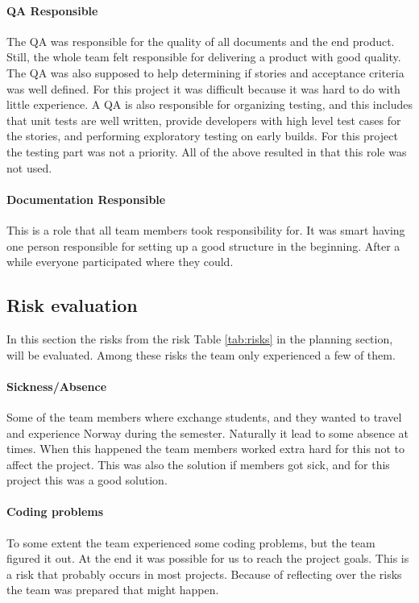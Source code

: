 \paragraph{QA Responsible}
The QA was responsible for the quality of all documents and the end product. Still, the whole team felt responsible for delivering a product with good quality. The QA was also supposed to help determining if stories and acceptance criteria was well defined. For this project it was difficult because it was hard to do with little experience. A QA is also responsible for organizing testing, and this includes that unit tests are well written, provide developers with high level test cases for the stories, and performing exploratory testing on early builds. For this project the testing part was not a priority. All of the above resulted in that this role was not used.

\paragraph{Documentation Responsible}
This is a role that all team members took responsibility for. It was smart having one person responsible for setting up a good structure in the beginning. After a while everyone participated where they could. 

\subsection{Risk evaluation}
In this section the risks from the risk Table \ref{tab:risks} in the planning section, will be evaluated. Among these risks the team only experienced a few of them.

\paragraph{Sickness/Absence}
Some of the team members where exchange students, and they wanted to travel and experience Norway during the semester. Naturally it lead to some absence at times. When this happened the team members worked extra hard for this not to affect the project. This was also the solution if members got sick, and for this project this was a good solution. 

\paragraph{Coding problems}
To some extent the team experienced some coding problems, but the team figured it out. At the end it was possible for us to reach the project goals. This is a risk that probably occurs in most projects. Because of reflecting over the risks the team was prepared that might happen.

